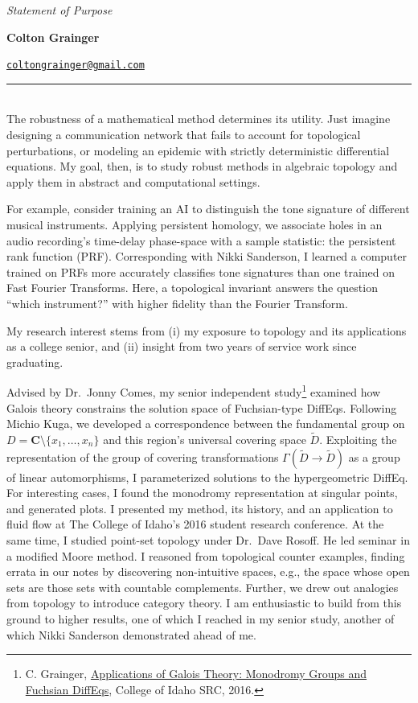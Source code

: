 \documentclass{article}
\makeatletter
\newcommand\textbox[1]{\parbox{.33\textwidth}{#1}}
\newcommand\printheader{
  \noindent 
  \textbox{\emph{Statement of Purpose}} 
  \textbox{\centerline{\large\bf Colton Grainger}} 
  \textbox{\raggedleft \href{mailto:coltongrainger@gmail.com}{\texttt{coltongrainger@gmail.com}}\ 
}

\vspace{-15pt} 
\noindent 
\rule{\textwidth}{1pt}\\ }
\makeatother
\begin{document}
 

\printheader

The robustness of a mathematical method determines its utility. Just imagine designing a communication network that fails to account for topological perturbations, or modeling an epidemic with strictly deterministic differential equations. My goal, then, is to study robust methods in algebraic topology and apply them in abstract and computational settings.

For example, consider training an AI to distinguish the tone signature of different musical instruments. Applying persistent homology, we associate holes in an audio recording's time-delay phase-space with a sample statistic: the persistent rank function (PRF). Corresponding with Nikki Sanderson, I learned a computer trained on PRFs more accurately classifies tone signatures than one trained on Fast Fourier Transforms.  Here, a topological invariant answers the question ``which instrument?'' with higher fidelity than the Fourier Transform.

My research interest stems from (i) my exposure to topology and its applications as a college senior, and (ii) insight from two years of service work since graduating.

Advised by Dr.~Jonny Comes, my senior independent study\footnote{C.  Grainger, \href{http://coltongrainger.com/documents/cgrainger_coursework_galois_poster.pdf}{Applications of Galois Theory: Monodromy Groups and Fuchsian DiffEqs}, College of Idaho SRC, 2016.} examined how Galois theory constrains the solution space of Fuchsian-type DiffEqs. Following Michio Kuga, we developed a correspondence between the fundamental group on \(D = \mathbf{C}\setminus\{x_1,\ldots,x_n\}\) and this region's universal covering space \(\tilde{D}\). Exploiting the representation of the group of covering transformations \(\Gamma(\tilde{D} \to \tilde{D})\) as a group of linear automorphisms, I parameterized solutions to the hypergeometric DiffEq. For interesting cases, I found the monodromy representation at singular points, and generated plots. I presented my method, its history, and an application to fluid flow at The College of Idaho's 2016 student research conference. At the same time, I studied point-set topology under Dr.~Dave Rosoff. He led seminar in a modified Moore method. I reasoned from topological counter examples, finding errata in our notes by discovering non-intuitive spaces, e.g., the space whose open sets are those sets with countable complements. Further, we drew out analogies from topology to introduce category theory. I am enthusiastic to build from this ground to higher results, one of which I reached in my senior study, another of which Nikki Sanderson demonstrated ahead of me.
\end{document}
